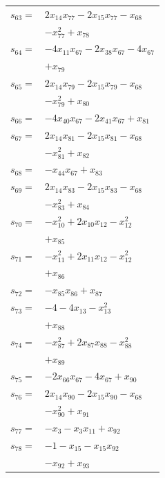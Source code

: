 \begin{longtable}{@{}r@{\;}l@{}}
\(s_{63}=\) & \(\displaystyle 2x_{14}x_{77} -2x_{15}x_{77} -x_{68}\) \\
 & \(\displaystyle -x_{77}^{2} +x_{78}\) \\[3pt]
\(s_{64}=\) & \(\displaystyle -4x_{11}x_{67} -2x_{38}x_{67} -4x_{67}\) \\
 & \(\displaystyle +x_{79}\) \\[3pt]
\(s_{65}=\) & \(\displaystyle 2x_{14}x_{79} -2x_{15}x_{79} -x_{68}\) \\
 & \(\displaystyle -x_{79}^{2} +x_{80}\) \\[3pt]
\(s_{66}=\) & \(\displaystyle -4x_{40}x_{67} -2x_{41}x_{67} +x_{81}\) \\[3pt]
\(s_{67}=\) & \(\displaystyle 2x_{14}x_{81} -2x_{15}x_{81} -x_{68}\) \\
 & \(\displaystyle -x_{81}^{2} +x_{82}\) \\[3pt]
\(s_{68}=\) & \(\displaystyle -x_{44}x_{67} +x_{83}\) \\[3pt]
\(s_{69}=\) & \(\displaystyle 2x_{14}x_{83} -2x_{15}x_{83} -x_{68}\) \\
 & \(\displaystyle -x_{83}^{2} +x_{84}\) \\[3pt]
\(s_{70}=\) & \(\displaystyle -x_{10}^{2} +2x_{10}x_{12} -x_{12}^{2}\) \\
 & \(\displaystyle +x_{85}\) \\[3pt]
\(s_{71}=\) & \(\displaystyle -x_{11}^{2} +2x_{11}x_{12} -x_{12}^{2}\) \\
 & \(\displaystyle +x_{86}\) \\[3pt]
\(s_{72}=\) & \(\displaystyle -x_{85}x_{86} +x_{87}\) \\[3pt]
\(s_{73}=\) & \(\displaystyle -4 -4x_{13} -x_{13}^{2}\) \\
 & \(\displaystyle +x_{88}\) \\[3pt]
\(s_{74}=\) & \(\displaystyle -x_{87}^{2} +2x_{87}x_{88} -x_{88}^{2}\) \\
 & \(\displaystyle +x_{89}\) \\[3pt]
\(s_{75}=\) & \(\displaystyle -2x_{66}x_{67} -4x_{67} +x_{90}\) \\[3pt]
\(s_{76}=\) & \(\displaystyle 2x_{14}x_{90} -2x_{15}x_{90} -x_{68}\) \\
 & \(\displaystyle -x_{90}^{2} +x_{91}\) \\[3pt]
\(s_{77}=\) & \(\displaystyle -x_{3} -x_{3}x_{11} +x_{92}\) \\[3pt]
\(s_{78}=\) & \(\displaystyle -1 -x_{15} -x_{15}x_{92}\) \\
 & \(\displaystyle -x_{92} +x_{93}\) \\[3pt]

\end{longtable}
